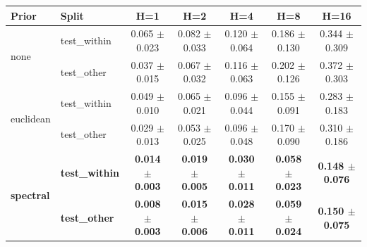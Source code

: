 \begin{tabular}{llccccc}
\toprule
Prior & Split & H=1 & H=2 & H=4 & H=8 & H=16 \\
\midrule
\multirow{2}{*}{none} & test\_within & 0.065 $\pm$ 0.023 & 0.082 $\pm$ 0.033 & 0.120 $\pm$ 0.064 & 0.186 $\pm$ 0.130 & 0.344 $\pm$ 0.309 \\
 & test\_other & 0.037 $\pm$ 0.015 & 0.067 $\pm$ 0.032 & 0.116 $\pm$ 0.063 & 0.202 $\pm$ 0.126 & 0.372 $\pm$ 0.303 \\
\midrule
\multirow{2}{*}{euclidean} & test\_within & 0.049 $\pm$ 0.010 & 0.065 $\pm$ 0.021 & 0.096 $\pm$ 0.044 & 0.155 $\pm$ 0.091 & 0.283 $\pm$ 0.183 \\
 & test\_other & 0.029 $\pm$ 0.013 & 0.053 $\pm$ 0.025 & 0.096 $\pm$ 0.048 & 0.170 $\pm$ 0.090 & 0.310 $\pm$ 0.186 \\
\midrule
\multirow{2}{*}{\textbf{spectral}} & \textbf{test\_within} & \textbf{0.014 $\pm$ 0.003} & \textbf{0.019 $\pm$ 0.005} & \textbf{0.030 $\pm$ 0.011} & \textbf{0.058 $\pm$ 0.023} & \textbf{0.148 $\pm$ 0.076} \\
 & \textbf{test\_other} & \textbf{0.008 $\pm$ 0.003} & \textbf{0.015 $\pm$ 0.006} & \textbf{0.028 $\pm$ 0.011} & \textbf{0.059 $\pm$ 0.024} & \textbf{0.150 $\pm$ 0.075} \\
\bottomrule
\end{tabular}
